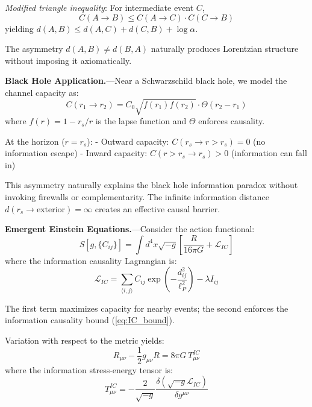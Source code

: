 \documentclass[aps,prl,twocolumn,showpacs,superscriptaddress,groupedaddress]{revtex4-2}
\begin{document}
\textit{Modified triangle inequality}: For intermediate event $C$,
\begin{equation}
C(A \to B) \leq C(A \to C) \cdot C(C \to B)
\end{equation}
yielding $d(A,B) \leq d(A,C) + d(C,B) + \log\alpha$.

The asymmetry $d(A,B) \neq d(B,A)$ naturally produces Lorentzian structure without imposing it axiomatically.

\textbf{Black Hole Application.}---Near a Schwarzschild black hole, we model the channel capacity as:
\begin{equation}
C(r_1 \to r_2) = C_0 \sqrt{f(r_1)f(r_2)} \cdot \Theta(r_2 - r_1)
\end{equation}
where $f(r) = 1 - r_s/r$ is the lapse function and $\Theta$ enforces causality.

At the horizon ($r = r_s$):
- Outward capacity: $C(r_s \to r > r_s) = 0$ (no information escape)
- Inward capacity: $C(r > r_s \to r_s) > 0$ (information can fall in)

This asymmetry naturally explains the black hole information paradox without invoking firewalls or complementarity. The infinite information distance $d(r_s \to \text{exterior}) = \infty$ creates an effective causal barrier.

\textbf{Emergent Einstein Equations.}---Consider the action functional:
\begin{equation}
S[g, \{C_{ij}\}] = \int d^4x \sqrt{-g} \left[\frac{R}{16\pi G} + \mathcal{L}_{IC}\right]
\label{eq:action}
\end{equation}
where the information causality Lagrangian is:
\begin{equation}
\mathcal{L}_{IC} = \sum_{\langle i,j \rangle} C_{ij} \exp\left(-\frac{d_{ij}^2}{\ell_P^2}\right) - \lambda I_{ij}
\end{equation}

The first term maximizes capacity for nearby events; the second enforces the information causality bound (\ref{eq:IC_bound}).

Variation with respect to the metric yields:
\begin{equation}
R_{\mu\nu} - \frac{1}{2}g_{\mu\nu}R = 8\pi G \, T^{IC}_{\mu\nu}
\label{eq:einstein_IC}
\end{equation}
where the information stress-energy tensor is:
\begin{equation}
T^{IC}_{\mu\nu} = -\frac{2}{\sqrt{-g}} \frac{\delta(\sqrt{-g}\mathcal{L}_{IC})}{\delta g^{\mu\nu}}
\end{equation}
\end{document}
